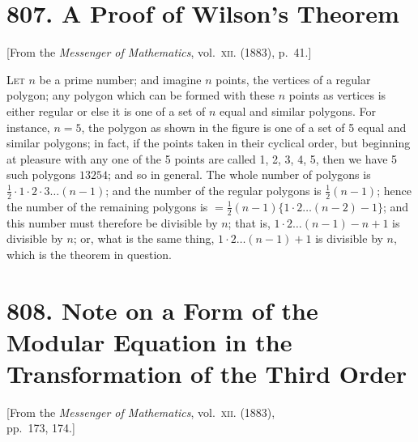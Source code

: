 \documentclass[11pt,a4paper]{book}
\begin{document}
\newpage
\section*{807. A Proof of Wilson's Theorem}

\begin{center}
\small[From the \textit{Messenger of Mathematics}, vol.~\textsc{xii}. (1883), p.~41.]
\end{center}

\bigskip

\noindent
\textsc{Let} $n$ be a prime number; and imagine $n$ points, the vertices of a regular polygon; any polygon which can be formed with these $n$ points as vertices is either regular or else it is one of a set of $n$ equal and similar polygons. For instance, $n=5$, the polygon as shown in the figure is one of a set of 5 equal and similar polygons; in fact, if the points taken in their cyclical order, but beginning at pleasure with any one of the 5 points are called 1, 2, 3, 4, 5, then we have 5 such polygons $13254$; and so in general. The whole number of polygons is $\frac{1}{2}\cdot 1\cdot 2\cdot 3\ldots(n-1)$; and the number of the regular polygons is $\frac{1}{2}(n-1)$; hence the number of the remaining polygons is $= \frac{1}{2}(n-1)\{1\cdot 2\ldots(n-2) - 1\}$; and this number must therefore be divisible by $n$; that is, $1\cdot 2\ldots(n-1) - n + 1$ is divisible by $n$; or, what is the same thing, $1\cdot 2\ldots(n-1) + 1$ is divisible by $n$, which is the theorem in question.


\newpage
\section*{808. Note on a Form of the Modular Equation in the Transformation of the Third Order}

\begin{center}
\small[From the \textit{Messenger of Mathematics}, vol.~\textsc{xii}. (1883),\\
pp.~173, 174.]
\end{center}
\end{document}
